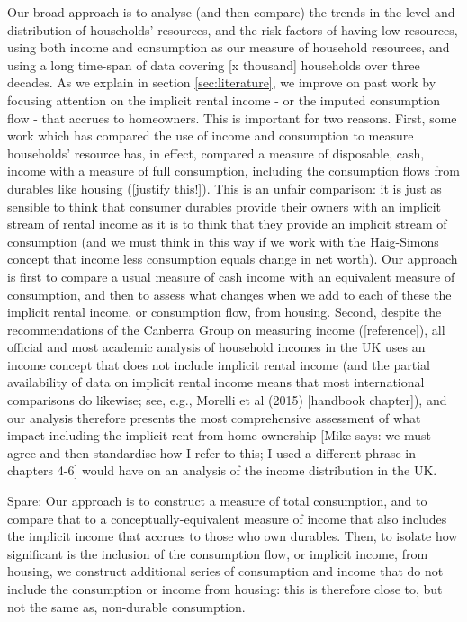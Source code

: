 Our broad approach is to analyse (and then compare) the trends in the level and distribution of households' resources, and the risk factors of having low resources, using both income and consumption as our measure of household resources, and using a long time-span of data covering [x thousand] households over three decades. 
As we explain in section \ref{sec:literature}, we improve on past work by focusing attention on the implicit rental income - or the imputed consumption flow - that accrues to homeowners. This is important for two reasons. First, some work which has compared the use of income and consumption to measure households' resource has, in effect, compared a measure of disposable, cash, income with a measure of full consumption, including the consumption flows from durables like housing ([justify this!]). This is an unfair comparison: it is just as sensible to think that consumer durables provide their owners with an implicit stream of rental income as it is to think that they provide an implicit stream of consumption (and we must think in this way if we work with the Haig-Simons concept that income less consumption equals change in net worth). Our approach is first to compare a usual measure of cash income with an equivalent measure of consumption, and then to assess what changes when we add to each of these the implicit rental income, or consumption flow, from housing.  Second, despite the recommendations of the Canberra Group on measuring income ([reference]), all official and most academic analysis of household incomes in the UK uses an income concept that does not include implicit rental income (and the partial availability of data on implicit rental income means that most international comparisons do likewise; see, e.g., Morelli et al (2015) [handbook chapter]), and our analysis therefore presents the most comprehensive assessment of what impact including the implicit rent from home ownership [Mike says: we must agree and then standardise how I refer to this; I used a different phrase in chapters 4-6] would have on an analysis of the income distribution in the UK.    

Spare: Our approach is to construct a measure of total consumption, and to compare that to a conceptually-equivalent measure of income that also includes the implicit income that accrues to those who own durables. Then, to isolate how significant is the inclusion of the consumption flow, or implicit income, from housing, we construct additional series of consumption and income that do not include the consumption or income from housing: this is therefore close to, but not the same as, non-durable consumption.


